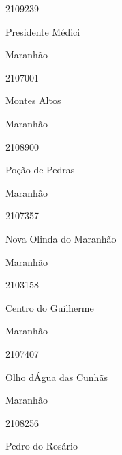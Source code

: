 \documentclass[
  letterpaper,
]{report}
\begin{document}
2109239

\n      

Presidente Médici

\n    

\n    

\n      

Maranhão

\n      

2107001

\n      

Montes Altos

\n    

\n    

\n      

Maranhão

\n      

2108900

\n      

Poção de Pedras

\n    

\n    

\n      

Maranhão

\n      

2107357

\n      

Nova Olinda do Maranhão

\n    

\n    

\n      

Maranhão

\n      

2103158

\n      

Centro do Guilherme

\n    

\n    

\n      

Maranhão

\n      

2107407

\n      

Olho d\textquotesingle Água das Cunhãs

\n    

\n    

\n      

Maranhão

\n      

2108256

\n      

Pedro do Rosário
\end{document}
